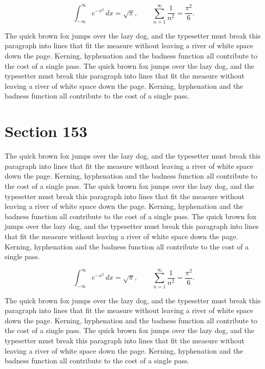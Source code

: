 \documentclass{article}
\begin{document}
\begin{equation}
\int_{-\infty}^{\infty} e^{-x^{2}}\,dx = \sqrt{\pi}, \qquad
\sum_{n=1}^{\infty} \frac{1}{n^{2}} = \frac{\pi^{2}}{6}.
\end{equation}

The quick brown fox jumps over the lazy dog, and the typesetter must break this paragraph into lines that fit the measure without leaving a river of white space down the page. Kerning, hyphenation and the badness function all contribute to the cost of a single pass. The quick brown fox jumps over the lazy dog, and the typesetter must break this paragraph into lines that fit the measure without leaving a river of white space down the page. Kerning, hyphenation and the badness function all contribute to the cost of a single pass. 
\section{Section 153}
The quick brown fox jumps over the lazy dog, and the typesetter must break this paragraph into lines that fit the measure without leaving a river of white space down the page. Kerning, hyphenation and the badness function all contribute to the cost of a single pass. The quick brown fox jumps over the lazy dog, and the typesetter must break this paragraph into lines that fit the measure without leaving a river of white space down the page. Kerning, hyphenation and the badness function all contribute to the cost of a single pass. The quick brown fox jumps over the lazy dog, and the typesetter must break this paragraph into lines that fit the measure without leaving a river of white space down the page. Kerning, hyphenation and the badness function all contribute to the cost of a single pass. 

\begin{equation}
\int_{-\infty}^{\infty} e^{-x^{2}}\,dx = \sqrt{\pi}, \qquad
\sum_{n=1}^{\infty} \frac{1}{n^{2}} = \frac{\pi^{2}}{6}.
\end{equation}

The quick brown fox jumps over the lazy dog, and the typesetter must break this paragraph into lines that fit the measure without leaving a river of white space down the page. Kerning, hyphenation and the badness function all contribute to the cost of a single pass. The quick brown fox jumps over the lazy dog, and the typesetter must break this paragraph into lines that fit the measure without leaving a river of white space down the page. Kerning, hyphenation and the badness function all contribute to the cost of a single pass. 
\end{document}
